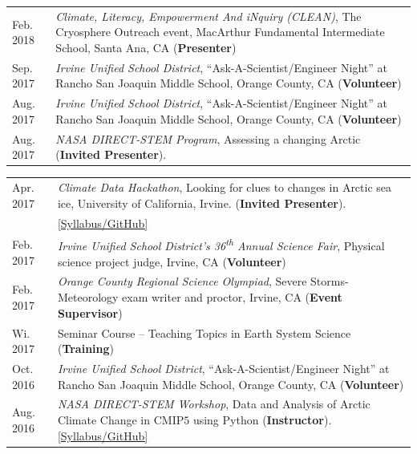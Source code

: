 \documentclass[margin,line,palatino,courier,10pt]{res}
\begin{document}
\begin{resume}
\begin{tabular}{@{}p{0.9in}p{4in}}
Feb. 2018 & \textit{Climate, Literacy, Empowerment And iNquiry (CLEAN)}, The Cryosphere Outreach event, MacArthur Fundamental Intermediate School, Santa Ana, CA (\textbf{Presenter})\\
Sep. 2017 & \textit{Irvine Unified School District}, ``Ask-A-Scientist/Engineer Night'' at Rancho San Joaquin Middle School, Orange County, CA (\textbf{Volunteer})\\
Aug. 2017 & \textit{Irvine Unified School District}, ``Ask-A-Scientist/Engineer Night'' at Rancho San Joaquin Middle School, Orange County, CA (\textbf{Volunteer})\\
Aug. 2017 & \textit{NASA DIRECT-STEM Program}, Assessing a changing Arctic (\textbf{Invited Presenter}).\\
\end{tabular}
\begin{tabular}{@{}p{0.9in}p{4in}}
Apr. 2017 & \textit{Climate Data Hackathon}, Looking for clues to changes in Arctic 
sea ice, University of California, Irvine. (\textbf{Invited Presenter}).\\ & \href{https://github.com/UCIDataScienceInitiative/Climate_Hackathon}{[Syllabus/GitHub]}\\
Feb. 2017 & \textit{Irvine Unified School District's 36\textsuperscript{th} Annual Science Fair}, Physical science project judge, Irvine, CA (\textbf{Volunteer})\\
Feb. 2017 & \textit{Orange County Regional Science Olympiad}, Severe Storms-Meteorology exam writer and proctor, Irvine, CA (\textbf{Event Supervisor})\\
Wi. 2017 & Seminar Course -- Teaching Topics in Earth System Science (\textbf{Training})\\
Oct. 2016 & \textit{Irvine Unified School District}, ``Ask-A-Scientist/Engineer Night'' at Rancho San Joaquin Middle School, Orange County, CA (\textbf{Volunteer})\\
Aug. 2016 & \textit{NASA DIRECT-STEM Workshop}, Data and Analysis of Arctic Climate Change in CMIP$5$ using Python (\textbf{Instructor}). \href{https://github.com/strongh/DIRECT-STEM-climate-workshop}{[Syllabus/GitHub]}\\
\end{tabular}

\vspace{-0.1in}
\noindent\textcolor{Cerulean}{\makebox[\linewidth][r]{\rule{\textwidth}{5pt}}}

\end{resume}
\end{document}
